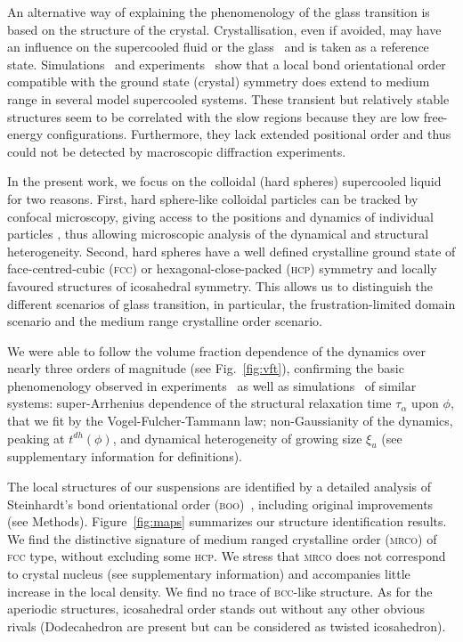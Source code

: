 An alternative way of explaining the phenomenology of the glass transition is based on the structure of the crystal. Crystallisation, even if avoided, may have an influence on the supercooled fluid or the glass~\citep{TanakaGJPCM, Cavagna2003, VanMegen2009a} and is taken as a reference state. Simulations~\cite{tanaka2010critical, Pedersen2010, Coslovich2011} and experiments~\citep{tanaka2010critical} show that a local bond orientational order compatible with the ground state (crystal) symmetry does extend to medium range in several model supercooled systems. These transient but relatively stable structures seem to be correlated with the slow regions because they are low free-energy configurations. Furthermore, they lack extended positional order and thus could not be detected by macroscopic diffraction experiments.

In the present work, we focus on the colloidal (hard spheres) supercooled liquid \cite{pusey1987ogt} for two reasons. First, hard sphere-like colloidal particles can be tracked by confocal microscopy, giving access to the positions and dynamics of individual particles \cite{kegel2000swe, weeks2000}, thus allowing microscopic analysis of the dynamical and structural heterogeneity. Second, hard spheres have a well defined crystalline ground state of face-centred-cubic (\textsc{fcc}) or hexagonal-close-packed (\textsc{hcp}) symmetry and locally favoured structures of icosahedral symmetry. This allows us to distinguish the different scenarios of glass transition, in particular, the frustration-limited domain scenario and the medium range crystalline order scenario.



We were able to follow the volume fraction dependence of the dynamics over nearly three orders of magnitude (see Fig.~\ref{fig:vft}), confirming the basic phenomenology observed in experiments~\citep{pusey1987ogt, kegel2000swe, weeks2000, BerthierR} as well as simulations~\citep{tanaka2010critical} of similar systems: super-Arrhenius dependence of the structural relaxation time $\tau_\alpha$ upon $\phi$, that we fit by the Vogel-Fulcher-Tammann law; non-Gaussianity of the dynamics, peaking at $t^{dh}(\phi)$, and dynamical heterogeneity of growing size $\xi_u$ (see supplementary information for definitions).



The local structures of our suspensions are identified by a detailed analysis of Steinhardt's bond orientational order (\textsc{boo})~\citep{steinhardt1983boo}, including original improvements (see Methods). Figure~\ref{fig:maps} summarizes our structure identification results. We find the distinctive signature of medium ranged crystalline order (\textsc{mrco}) of \textsc{fcc} type, without excluding some \textsc{hcp}. We stress that \textsc{mrco} does not correspond to crystal nucleus (see supplementary information) and accompanies little increase in the local density. We find no trace of \textsc{bcc}-like structure. As for the aperiodic structures, icosahedral order stands out without any other obvious rivals (Dodecahedron are present but can be considered as twisted icosahedron).



